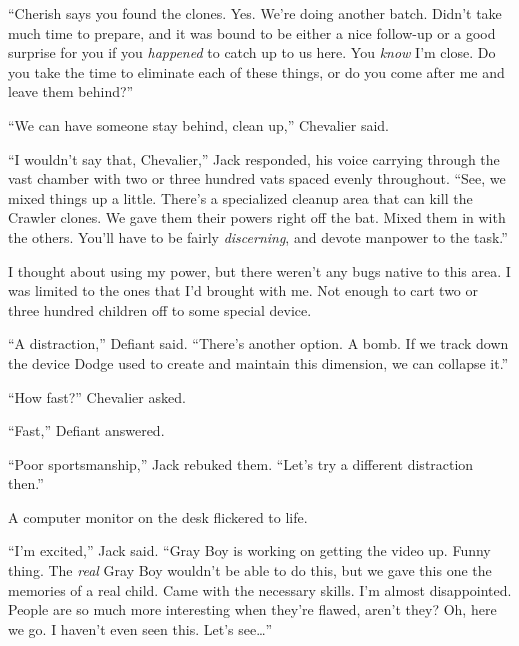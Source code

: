 ``Cherish says you found the clones.  Yes.  We're doing another batch.  Didn't take much time to prepare, and it was bound to be either a nice follow-up or a good surprise for you if you \emph{happened }to catch up to us here.  You \emph{know} I'm close.  Do you take the time to eliminate each of these things, or do you come after me and leave them behind?''



``We can have someone stay behind, clean up,'' Chevalier said.



``I wouldn't say that, Chevalier,'' Jack responded, his voice carrying through the vast chamber with two or three hundred vats spaced evenly throughout.  ``See, we mixed things up a little.  There's a specialized cleanup area that can kill the Crawler clones.  We gave them their powers right off the bat.  Mixed them in with the others.  You'll have to be fairly \emph{discerning}, and devote manpower to the task.''



I thought about using my power, but there weren't any bugs native to this area.  I was limited to the ones that I'd brought with me.  Not enough to cart two or three hundred children off to some special device.



``A distraction,'' Defiant said.  ``There's another option.  A bomb.  If we track down the device Dodge used to create and maintain this dimension, we can collapse it.''



``How fast?'' Chevalier asked.



``Fast,'' Defiant answered.



``Poor sportsmanship,''  Jack rebuked them.  ``Let's try a different distraction then.''



A computer monitor on the desk flickered to life.



``I'm excited,'' Jack said.  ``Gray Boy is working on getting the video up.  Funny thing.  The \emph{real} Gray Boy wouldn't be able to do this, but we gave this one the memories of a real child.  Came with the necessary skills.  I'm almost disappointed.  People are so much more interesting when they're flawed, aren't they?  Oh, here we go.  I haven't even seen this.  Let's see\ldots''




